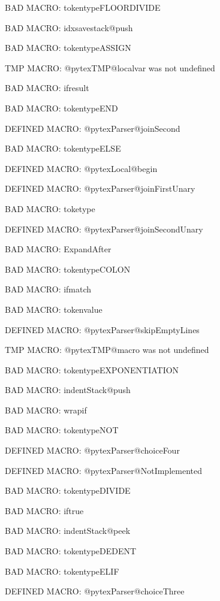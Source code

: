 BAD MACRO: tokentypeFLOORDIVIDE

BAD MACRO: idxsavestack@push

BAD MACRO: tokentypeASSIGN

\ifx\@pytexTMP@localvar\undefined\else TMP MACRO: @pytexTMP@localvar was not undefined
\fi

BAD MACRO: ifresult

BAD MACRO: tokentypeEND

\ifx\@pytexParser@joinSecond\undefined\else DEFINED MACRO: @pytexParser@joinSecond
\fi

BAD MACRO: tokentypeELSE

\ifx\@pytexLocal@begin\undefined\else DEFINED MACRO: @pytexLocal@begin
\fi

\ifx\@pytexParser@joinFirstUnary\undefined\else DEFINED MACRO: @pytexParser@joinFirstUnary
\fi

BAD MACRO: toketype

\ifx\@pytexParser@joinSecondUnary\undefined\else DEFINED MACRO: @pytexParser@joinSecondUnary
\fi

BAD MACRO: ExpandAfter

BAD MACRO: tokentypeCOLON

BAD MACRO: ifmatch

BAD MACRO: tokenvalue

\ifx\@pytexParser@skipEmptyLines\undefined\else DEFINED MACRO: @pytexParser@skipEmptyLines
\fi

\ifx\@pytexTMP@macro\undefined\else TMP MACRO: @pytexTMP@macro was not undefined
\fi

BAD MACRO: tokentypeEXPONENTIATION

BAD MACRO: indentStack@push

BAD MACRO: wrapif

BAD MACRO: tokentypeNOT

\ifx\@pytexParser@choiceFour\undefined\else DEFINED MACRO: @pytexParser@choiceFour
\fi

\ifx\@pytexParser@NotImplemented\undefined\else DEFINED MACRO: @pytexParser@NotImplemented
\fi

BAD MACRO: tokentypeDIVIDE

BAD MACRO: iftrue

BAD MACRO: indentStack@peek

BAD MACRO: tokentypeDEDENT

BAD MACRO: tokentypeELIF

\ifx\@pytexParser@choiceThree\undefined\else DEFINED MACRO: @pytexParser@choiceThree
\fi

